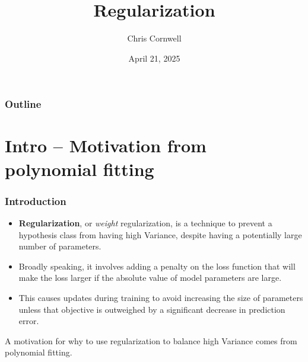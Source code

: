 \documentclass[smaller]{beamer}
\author{Chris Cornwell}
\date{April 21, 2025}
\title{Regularization}
\theoremstyle{example}
\begin{document}
\begin{frame}
\titlepage
\end{frame}

\begin{frame}
    \frametitle{Outline}
    \tableofcontents
\end{frame}

\section{Intro {--} Motivation from polynomial fitting}

\begin{frame}
    \frametitle{Introduction}
    \begin{itemize}
        \item \textbf{Regularization}, or \textit{weight} regularization, is a technique to prevent a hypothesis class from having high Variance, despite having a potentially large number of parameters. 
        \item Broadly speaking, it involves adding a penalty on the loss function that will make the loss larger if the absolute value of model parameters are large.
        \item This causes updates during training to avoid increasing the size of parameters unless that objective is outweighed by a significant decrease in prediction error.
    \end{itemize}

    A motivation for why to use regularization to balance high Variance comes from polynomial fitting.
\end{frame}
\end{document}
